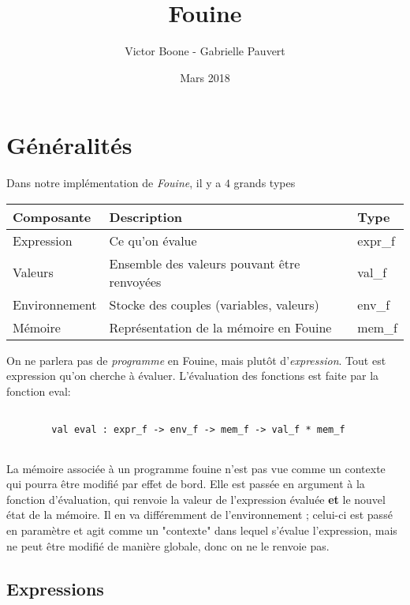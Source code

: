 \documentclass{article}
\title{\textbf{Fouine}}
\date{Mars 2018}
\author{Victor Boone - Gabrielle Pauvert}
\newcommand\code[1]{{\fontfamily{lmtt}\selectfont #1}}
\begin{document}
\maketitle


\section{Généralités}

	Dans notre implémentation de \emph{Fouine}, il y a $4$ grands types
	
	\vspace{0.5cm}
	
	\begin{tabular}{l l l}
	Composante & Description & Type \\
	\hline
	Expression & Ce qu'on évalue & \code{expr\_f} \\
	Valeurs & Ensemble des valeurs pouvant être renvoyées & \code{val\_f} \\
	Environnement & Stocke des couples (variables, valeurs) & \code{env\_f} \\
	Mémoire & Représentation de la mémoire en Fouine & \code{mem\_f} 
	\end{tabular}
	
	\vspace{0.5cm}
	
	On ne parlera pas de \emph{programme} en Fouine, mais plutôt d'\emph{expression}. Tout est expression qu'on cherche à évaluer. L'évaluation des fonctions est faite par la fonction \code{eval}:
	
	
	\begin{verbatim}
	
		val eval : expr_f -> env_f -> mem_f -> val_f * mem_f
	
	\end{verbatim}
	
	La mémoire associée à un programme fouine n'est pas vue comme un contexte qui pourra être modifié par effet de bord. Elle est passée en argument à la fonction d'évaluation, qui renvoie la valeur de l'expression évaluée \textbf{et} le nouvel état de la mémoire. Il en va différemment de l'environnement ; celui-ci est passé en paramètre et agit comme un "contexte" dans lequel s'évalue l'expression, mais ne peut être modifié de manière globale, donc on ne le renvoie pas.
	
\subsection{Expressions}
\end{document}
